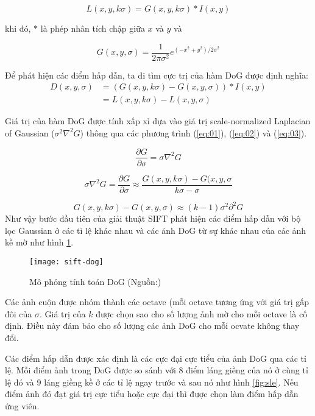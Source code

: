 \begin{equation}\label{eq:01}
L(x,y,k\sigma) = G(x,y,k\sigma)*I(x,y)
\end{equation}
	
khi đó, $*$ là phép nhân tích chập giữa $x$ và $y$ và

\begin{equation}\label{eq:02}
G(x,y,\sigma) = \frac{1}{2\pi\sigma^2} e^{(-x^2 + y^2)/2\sigma^2}
\end{equation}
	
Để phát hiện các điểm hấp dẫn, ta đi tìm cực trị của hàm DoG được định nghĩa:
\begin{equation}\label{eq:03}
	\begin{split}
		D(x,y,\sigma) &= (G(x,y,k\sigma) - G(x,y,\sigma)) * I(x,y)\\
		&= L(x,y,k\sigma) -  L(x,y,\sigma)
	\end{split}
\end{equation}
	
Giá trị của hàm DoG được tính xấp xỉ dựa vào giá trị scale-normalized Laplacian	of Gaussian ($\sigma^2 \nabla^2G$) thông qua các phương trình (\ref{eq:01}), (\ref{eq:02}) và (\ref{eq:03}).
	
\begin{equation}
\frac{\partial G}{\partial \sigma} = \sigma \nabla^2G
\end{equation}
	
\begin{equation}
	\sigma \nabla^2 G = \frac{\partial G}{\partial \sigma} \approx \frac{G(x,y,k \sigma) - G(x,y,\sigma}{k \sigma - \sigma}
\end{equation}
	
\begin{equation}
G(x,y,k\sigma) - G(x,y,\sigma) \approx (k-1)\sigma^2 \partial^2 G
\end{equation}
Như vậy bước đầu tiên của giải thuật SIFT phát hiện các điểm hấp dẫn với bộ lọc Gaussian ở các tỉ lệ khác nhau và các ảnh DoG từ sự khác nhau của các ảnh kề mờ như hình \ref{fig:sd}.	
	
\begin{figure}[h]
	\centering
	\texttt{[image: sift-dog]}
	\caption[Mô phỏng tính toán DoG]{Mô phỏng tính toán DoG (Nguồn:\cite{lowe2004distinctive})}
	\label{fig:sd}
\end{figure}

Các ảnh cuộn được nhóm thành các octave (mỗi octave tương ứng với giá trị gấp đôi của $\sigma$. Giá trị của $k$ được chọn sao cho số lượng ảnh mờ cho mỗi octave là cố định. Điều này đảm bảo cho số lượng các ảnh DoG cho mỗi ocvate không thay đổi.\par
Các điểm hấp dẫn được xác định là các cực đại cực tiểu của ảnh DoG qua các tỉ lệ. Mỗi điểm ảnh trong DoG được so sánh với 8 điểm láng giềng của nó ở cùng tỉ lệ đó và 9 láng giềng kề ở các tỉ lệ ngay trước và sau nó như hình \ref{fig:sle}. Nếu điểm ảnh đó đạt giá trị cực tiểu hoặc cực đại thì được chọn làm điểm hấp dẫn ứng viên.
	
